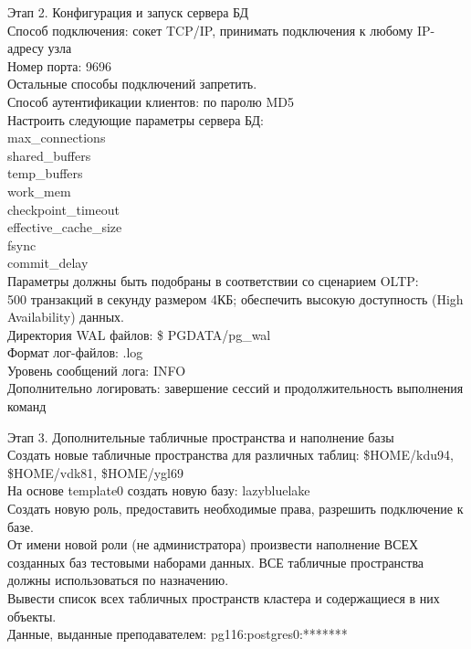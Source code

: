 Этап 2. Конфигурация и запуск сервера БД\\
Способ подключения: сокет TCP/IP, принимать подключения к любому IP-адресу узла\\
Номер порта: 9696\\
Остальные способы подключений запретить.\\
Способ аутентификации клиентов: по паролю MD5\\
Настроить следующие параметры сервера БД:\\
max\_connections\\
shared\_buffers\\
temp\_buffers\\
work\_mem\\
checkpoint\_timeout\\
effective\_cache\_size\\
fsync\\
commit\_delay\\
Параметры должны быть подобраны в соответствии со сценарием OLTP:\\
500 транзакций в секунду размером 4КБ; обеспечить высокую доступность (High Availability) данных.\\
Директория WAL файлов: \$ PGDATA/pg\_wal\\
Формат лог-файлов: .log\\
Уровень сообщений лога: INFO\\
Дополнительно логировать: завершение сессий и продолжительность выполнения команд

Этап 3. Дополнительные табличные пространства и наполнение базы\\
Создать новые табличные пространства для различных таблиц: \$HOME/kdu94, \$HOME/vdk81, \$HOME/ygl69\\
На основе template0 создать новую базу: lazybluelake\\
Создать новую роль, предоставить необходимые права, разрешить подключение к базе.\\
От имени новой роли (не администратора) произвести наполнение ВСЕХ созданных баз тестовыми наборами данных. ВСЕ табличные пространства должны использоваться по назначению.\\
Вывести список всех табличных пространств кластера и содержащиеся в них объекты.\\

Данные, выданные преподавателем: pg116:postgres0:*******

